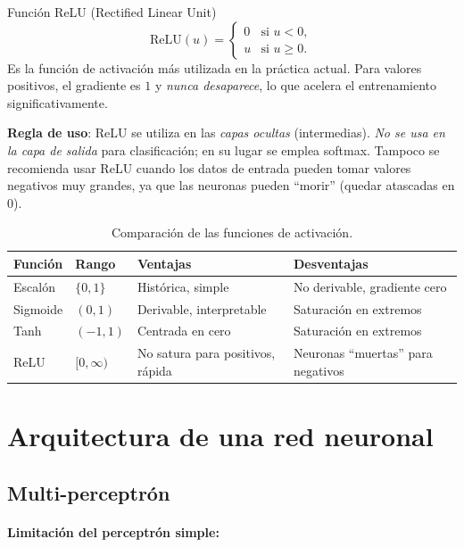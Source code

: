 \begin{definicion}
Función ReLU (Rectified Linear Unit)
\begin{equation}
\label{eq:relu}
\text{ReLU}(u) = 
\begin{cases}
0 & \text{si } u < 0, \\
u & \text{si } u \geq 0.
\end{cases}
\end{equation}
Es la función de activación más utilizada en la práctica actual. Para valores positivos, el gradiente es $1$ y \emph{nunca desaparece}, lo que acelera el entrenamiento significativamente.
\end{definicion}

\textbf{Regla de uso}: ReLU se utiliza en las \emph{capas ocultas} (intermedias). \emph{No se usa en la capa de salida} para clasificación; en su lugar se emplea softmax. Tampoco se recomienda usar ReLU cuando los datos de entrada pueden tomar valores negativos muy grandes, ya que las neuronas pueden ``morir'' (quedar atascadas en $0$).

\begin{table}[H]
\centering
\caption{Comparación de las funciones de activación.}
\label{tab:activaciones}
\small
\begin{tabularx}{\textwidth}{@{}lXXX@{}}
\toprule
\textbf{Función} & \textbf{Rango} & \textbf{Ventajas} & \textbf{Desventajas} \\
\midrule
Escalón & $\{0,1\}$ & Histórica, simple & No derivable, gradiente cero \\
Sigmoide & $(0,1)$ & Derivable, interpretable & Saturación en extremos \\
Tanh & $(-1,1)$ & Centrada en cero & Saturación en extremos \\
ReLU & $[0,\infty)$ & No satura para positivos, rápida & Neuronas ``muertas'' para negativos \\
\bottomrule
\end{tabularx}
\end{table}

\section{Arquitectura de una red neuronal}

\subsection{Multi-perceptrón}

\paragraph{Limitación del perceptrón simple:}

